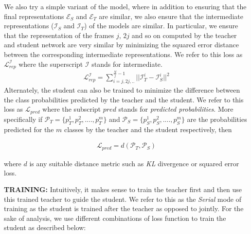 \documentclass[10pt,twocolumn,letterpaper]{article}
\begin{document}
We also try a simple variant of the model, where in addition to ensuring that the final representations $\mathcal{E}_S$ and $\mathcal{E}_T$  are similar, we also ensure that the intermediate representations ($\mathcal{I}_S$ and $\mathcal{I}_T$) of the models are similar. In particular, we ensure that the representation of the frames $j$, $2j$ and so on computed by the teacher and  student network are very similar by minimizing the squared error distance between the corresponding intermediate representations. We refer to this loss as $\mathcal{L}_{rep}^\mathcal{I}$ where the superscript $\mathcal{I}$ stands for intermediate. 
\begin{eqnarray}
 \mathcal{L}_{rep}^\mathcal{I} = \sum_{i=j,2j,..}^{\frac{N}{j}-1} ||\mathcal{I}_{T}^{i} - \mathcal{I}_{S}^{i} ||^{2}
 \label{eq3}
\end{eqnarray}
Alternately, the student can also be trained to minimize the difference between the class probabilities predicted by the teacher and the student. We refer to this loss as $\mathcal{L}_{pred}$ where the subscript $pred$ stands for \textit{predicted probabilities}. More specifically if $\mathcal{P}_{T} = \{p_T^1, p_T^2, ...., p_T^m\}$ and $\mathcal{P}_{S} = \{p_S^1, p_S^2, ...., p_S^m\}$ are the probabilities predicted for the $m$ classes by the teacher and the student respectively, then

\begin{eqnarray}
 \mathcal{L}_{pred} = d(\mathcal{P}_{T},\mathcal{P}_{S})  \label{eq4}
 \end{eqnarray}

where $d$ is any suitable distance metric such as \textit{KL} divergence or squared error loss.
 




\noindent \textbf{TRAINING:} Intuitively, it makes sense to train the teacher first and then use this trained teacher to guide the student. We refer to this as the \textit{Serial} mode of training as the student is trained after the teacher as opposed to jointly. For the sake of analysis, we use different combinations of loss function to train the student as described below:
\end{document}
